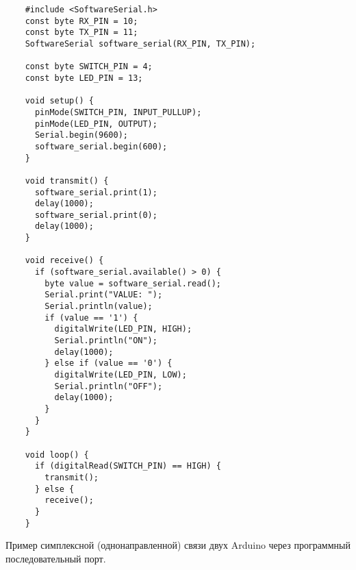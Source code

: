 \documentclass[../sparc.tex]{subfiles}
\begin{document}
\begin{listing}[H]
  \begin{verbatim}
    #include <SoftwareSerial.h>
    const byte RX_PIN = 10;
    const byte TX_PIN = 11;
    SoftwareSerial software_serial(RX_PIN, TX_PIN);

    const byte SWITCH_PIN = 4;
    const byte LED_PIN = 13;

    void setup() {
      pinMode(SWITCH_PIN, INPUT_PULLUP);
      pinMode(LED_PIN, OUTPUT);
      Serial.begin(9600);
      software_serial.begin(600);
    }

    void transmit() {
      software_serial.print(1);
      delay(1000);
      software_serial.print(0);
      delay(1000);
    }

    void receive() {
      if (software_serial.available() > 0) {
        byte value = software_serial.read();
        Serial.print("VALUE: ");
        Serial.println(value);
        if (value == '1') {
          digitalWrite(LED_PIN, HIGH);
          Serial.println("ON");
          delay(1000);
        } else if (value == '0') {
          digitalWrite(LED_PIN, LOW);
          Serial.println("OFF");
          delay(1000);
        }
      }
    }

    void loop() {
      if (digitalRead(SWITCH_PIN) == HIGH) {
        transmit();
      } else {
        receive();
      }
    }
  \end{verbatim}
  \label{listing:communication-serial-two-arduino-example}
  \caption{Пример симплексной (однонаправленной) связи двух Arduino через
    программный последовательный порт.}
\end{listing}
\end{document}
